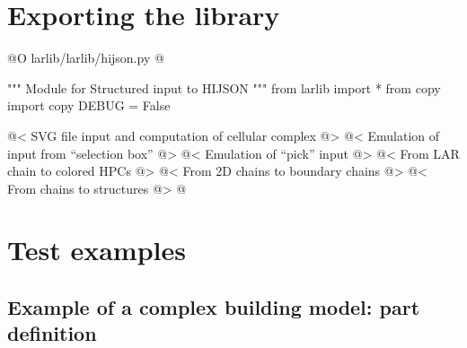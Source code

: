\documentclass[11pt,oneside]{article}    %
\begin{document}
\section{Exporting the library}


@O larlib/larlib/hijson.py
@{""" Module for Structured input to HIJSON """
from larlib import *
from copy import copy
DEBUG = False

@< SVG file input and computation of cellular complex @>
@< Emulation of input from ``selection box'' @>
@< Emulation of ``pick'' input @>
@< From LAR chain to colored HPCs @>
@< From 2D chains to boundary chains @>
@< From chains to structures @>
@}

\section{Test examples}


\subsection{Example of a complex building model: part definition}
\end{document}
